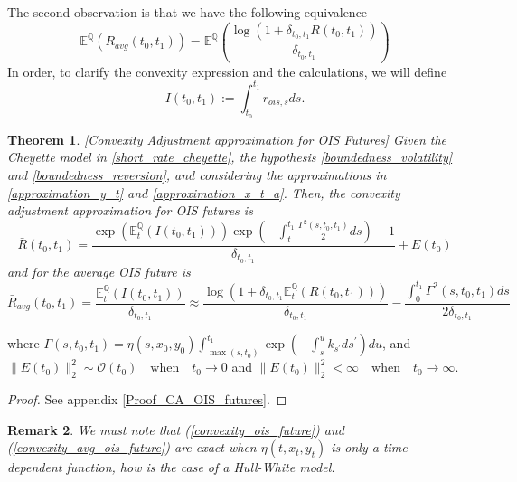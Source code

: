 \documentclass[a4paper,10pt]{article}
\newtheorem{theorem}{Theorem}[section]
\newtheorem{remark}[theorem]{Remark}
\newcommand{\1}{\mathbf{1}}
\begin{document}
The second observation is that we have the following equivalence
\begin{equation}\label{R_ois_avg}
\mathbb{E}^{\mathbb{Q}}\left(R_{avg}(t_0,t_1) \right) = \mathbb{E}^{\mathbb{Q}}\left( \frac{\log\left(1+ \delta_{t_0,t_1} R(t_0,t_1) \right)}{\delta_{t_0,t_1}} \right)  \end{equation}
In order, to clarify the convexity expression and the calculations, we will define 
\begin{equation*}
I(t_0,t_1) := \int_{t_0}^{t_1} r_{ois,s} ds.
\end{equation*}

\begin{theorem}\label{Th_CA_OIS}[Convexity Adjustment approximation for OIS Futures]
Given the Cheyette model in \eqref{short_rate_cheyette}, the hypothesis \ref{boundedness_volatility} and \ref{boundedness_reversion}, and considering the approximations in \eqref{approximation_y_t} and \eqref{approximation_x_t_a}. Then, the convexity adjustment approximation for OIS futures is 
\begin{equation}\label{convexity_ois_future}
\bar{R}(t_0,t_1) = \frac{\exp\left(\mathbb{E}_t^{\mathbb{Q}}\left(I(t_0,t_1)\right)\right)\exp\left(-\int_{t}^{t_1}\frac{\Gamma^{2}(s,t_0,t_1)}{2} ds\right) - 1}{\delta_{t_0,t_1}} + E(t_0)
\end{equation}
and for the average OIS future is
\begin{equation}\label{convexity_avg_ois_future}
\bar{R}_{avg}(t_0,t_1) = \frac{\mathbb{E}_t^{\mathbb{Q}}\left(I(t_0,t_1)\right) }{\delta_{t_0,t_1}} \approx \frac{\log\left(1+\delta_{t_0,t_1}  \mathbb{E}_t^{\mathbb{Q}}\left(R(t_0,t_1)\right) \right)}{\delta_{t_0,t_1}} - \frac{\int_{0}^{t_1}  \Gamma^{2}(s,t_0,t_1) ds}{2\delta_{t_0,t_1}}
\end{equation}
\end{theorem}
where  $\Gamma(s,t_0,t_1)= \eta(s,x_0,y_0)\int_{\max(s, t_{0})}^{t_1} \exp\left( -\int_{s}^{u} k_{s^{\prime}} ds^{\prime}\right)du$, and $\|E(t_0)\|^{2}_{2} \sim \mathcal{O}(t_0) \quad \text{when} \quad t_0 \to 0$ and $\|E(t_0)\|^{2}_{2} < \infty \quad \text{when} \quad t_0 \to \infty$.
\begin{proof}
See appendix \ref{Proof_CA_OIS_futures}.
\end{proof}

\begin{remark}
We must note that (\ref{convexity_ois_future}) and (\ref{convexity_avg_ois_future}) are exact when $\eta(t,x_t, y_t)$ is only a time dependent function, how is the case of a Hull-White model.
\end{remark}
\end{document}
